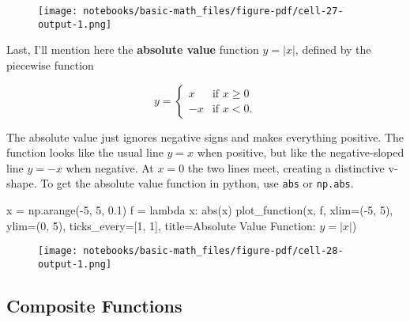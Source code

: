 \documentclass[
  letterpaper,
  DIV=11,
  numbers=noendperiod]{scrreprt}
\newenvironment{Shaded}{\begin{snugshade}}{\end{snugshade}}
\newcommand{\BuiltInTok}[1]{\textcolor[rgb]{0.00,0.23,0.31}{#1}}
\newcommand{\DecValTok}[1]{\textcolor[rgb]{0.68,0.00,0.00}{#1}}
\newcommand{\FloatTok}[1]{\textcolor[rgb]{0.68,0.00,0.00}{#1}}
\newcommand{\KeywordTok}[1]{\textcolor[rgb]{0.00,0.23,0.31}{#1}}
\newcommand{\NormalTok}[1]{\textcolor[rgb]{0.00,0.23,0.31}{#1}}
\newcommand{\OperatorTok}[1]{\textcolor[rgb]{0.37,0.37,0.37}{#1}}
\newcommand{\StringTok}[1]{\textcolor[rgb]{0.13,0.47,0.30}{#1}}
\begin{document}
\begin{figure}[H]

{\centering \texttt{[image: notebooks/basic-math\_files/figure-pdf/cell-27-output-1.png]}

}

\end{figure}

Last, I'll mention here the \textbf{absolute value} function
\(y = |x|\), defined by the piecewise function

\[
y = \begin{cases}
x & \text{if } x \ge 0 \\
-x & \text{if } x < 0.
\end{cases}
\]

The absolute value just ignores negative signs and makes everything
positive. The function looks like the usual line \(y=x\) when positive,
but like the negative-sloped line \(y=-x\) when negative. At \(x=0\) the
two lines meet, creating a distinctive v-shape. To get the absolute
value function in python, use \texttt{abs} or \texttt{np.abs}.

\begin{Shaded}
\begin{Highlighting}[]
\NormalTok{x }\OperatorTok{=}\NormalTok{ np.arange(}\OperatorTok{{-}}\DecValTok{5}\NormalTok{, }\DecValTok{5}\NormalTok{, }\FloatTok{0.1}\NormalTok{)}
\NormalTok{f }\OperatorTok{=} \KeywordTok{lambda}\NormalTok{ x: }\BuiltInTok{abs}\NormalTok{(x)}
\NormalTok{plot\_function(x, f, xlim}\OperatorTok{=}\NormalTok{(}\OperatorTok{{-}}\DecValTok{5}\NormalTok{, }\DecValTok{5}\NormalTok{), ylim}\OperatorTok{=}\NormalTok{(}\DecValTok{0}\NormalTok{, }\DecValTok{5}\NormalTok{), ticks\_every}\OperatorTok{=}\NormalTok{[}\DecValTok{1}\NormalTok{, }\DecValTok{1}\NormalTok{], }
\NormalTok{              title}\OperatorTok{=}\StringTok{\textquotesingle{}Absolute Value Function: $y=|x|$\textquotesingle{}}\NormalTok{)}
\end{Highlighting}
\end{Shaded}

\begin{figure}[H]

{\centering \texttt{[image: notebooks/basic-math\_files/figure-pdf/cell-28-output-1.png]}

}

\end{figure}

\hypertarget{composite-functions}{%
\subsection{Composite Functions}\label{composite-functions}}
\end{document}
